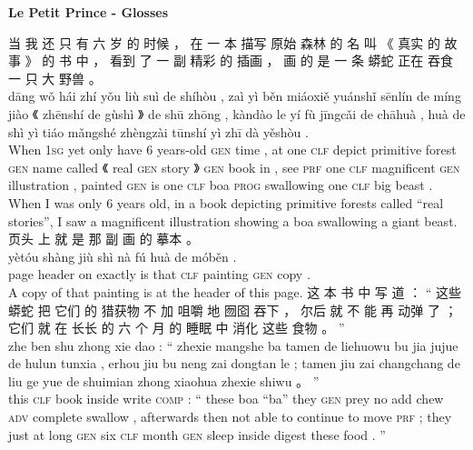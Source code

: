 \documentclass[UTF8]{ctexart}
\begin{document}
\begin{center}
\textbf{\Large{Le Petit Prince - Glosses}}\\
\end{center}


\begin{exe}
\ex 
\glll
当 我 还 只 有 六 岁 的 时候 ， 在 一 本 描写 原始 森林 的 名 叫 《 真实 的 故事 》 的 书 中 ， 看到 了 一 副 精彩 的 插画 ， 画 的 是 一 条 蟒蛇 正在 吞食 一 只 大 野兽 。\\
d\={a}ng w\v{o} h\'{a}i zh\'{i} y\v{o}u li\`{u} su\`{i} de sh\'{i}h\`{o}u , za\`{i} y\`{i} b\v{e}n mi\'{a}oxi\v{e} yu\'{a}nsh\v{i} s\={e}nl\'{i}n de m\'{i}ng ji\`{a}o 《 zh\={e}nsh\'{i} de g\`{u}sh\`{i} 》 de sh\={u} zh\={o}ng , k\`{a}nd\`{a}o le y\'{i} f\`{u} j\={i}ngc\v{a}i de ch\={a}hu\`{a} , hu\`{a} de sh\`{i} y\`{i} ti\'{a}o m\v{a}ngsh\'{e} zh\`{e}ngz\`{a}i t\={u}nsh\'{i} y\`{i} zh\={i} d\`{a} y\v{e}sh\`{o}u .\\
When \textsc{1sg} yet only have 6 years-old \textsc{gen} time , at one \textsc{clf} depict primitive forest \textsc{gen} name called 《 real \textsc{gen} story 》 \textsc{gen} book in , see \textsc{prf} one \textsc{clf} magnificent \textsc{gen} illustration , painted \textsc{gen} is one \textsc{clf} boa \textsc{prog} swallowing one \textsc{clf} big beast . \\
\trans When I was only 6 years old, in a book depicting primitive forests called ``real stories'', I saw a magnificent illustration showing a boa swallowing a giant beast. 
\ex
\glll
页头 上 就 是 那 副 画 的 摹本 。 \\
y\`{e}t\'{o}u sh\`{a}ng ji\`{u} sh\`{i} n\`{a} f\'{u} hu\`{a} de m\'{o}b\v{e}n .\\
{page header} on exactly is that \textsc{clf} painting \textsc{gen} copy .\\
\trans A copy of that painting is at the header of this page. 
\ex
\glll
这 本 书 中 写 道 ： `` 这些 蟒蛇 把 它们 的 猎获物 不 加 咀嚼 地 囫囵 吞下 ， 尔后 就 不 能 再 动弹 了 ； 它们 就 在 长长 的 六 个 月 的 睡眠 中 消化 这些 食物 。 '' \\
zhe ben shu zhong xie dao : `` zhexie mangshe ba tamen de liehuowu bu jia jujue de hulun tunxia , erhou jiu bu neng zai dongtan le ; tamen jiu zai changchang de liu ge yue de shuimian zhong xiaohua zhexie shiwu 。 ''
\\
this \textsc{clf} book inside write \textsc{comp} : `` these boa ``ba'' they \textsc{gen} prey no add chew \textsc{adv} complete swallow , afterwards then not {able to} {continue to} move \textsc{prf} ; they just at long \textsc{gen} six \textsc{clf} month \textsc{gen} sleep inside digest these food . ''

\end{exe}
\end{document}
